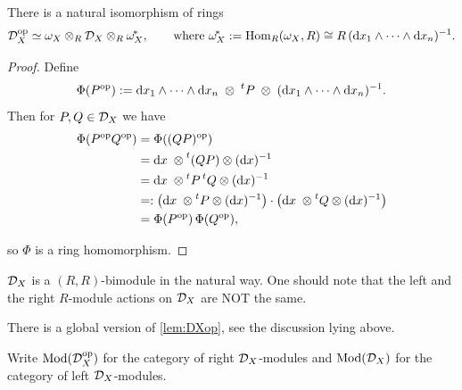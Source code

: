 \begin{lemma}\label{lem:DXop}
    There is a natural isomorphism of rings
    \[
        \mathcal{D}_X^{\mathrm{op}} \simeq \omega_X \otimes_R \mathcal{D}_X \otimes_R \omega_X^{\!*},\qquad
        \text{where } \omega_X^{\!*}:=\operatorname{Hom}_R(\omega_X,R) \cong R\,(\mathrm d x_1\wedge\cdots\wedge\mathrm d x_n)^{-1}.
    \]
\end{lemma}
\begin{proof}
    Define
    \[
        \Phi(P^{\mathrm{op}}):=\mathrm d x_1\wedge\cdots\wedge\mathrm d x_n\;\otimes\; \prescript{t}{}{P}\;\otimes\;
        (\mathrm d x_1\wedge\cdots\wedge\mathrm d x_n)^{-1}.
    \]
    Then for $P,Q\in\mathcal{D}_X$ we have
    \begin{align*}
        \Phi(P^{\mathrm{op}}Q^{\mathrm{op}})
         & = \Phi((QP)^{\mathrm{op}})                                                            \\
         & = \mathrm d x\;\otimes \prescript{t}{}{(QP)}\otimes (\mathrm d x)^{-1}                \\
         & = \mathrm d x\;\otimes \prescript{t}{}{P}\prescript{t}{}{Q}\otimes (\mathrm d x)^{-1} \\
         & =: \left(\mathrm d x\;\otimes \prescript{t}{}{P}\otimes (\mathrm d x)^{-1}\right)
        \cdot \left(\mathrm d x\;\otimes \prescript{t}{}{Q}\otimes (\mathrm d x)^{-1}\right)     \\
         & = \Phi(P^{\mathrm{op}})\,\Phi(Q^{\mathrm{op}}),
    \end{align*}

    so $\Phi$ is a ring homomorphism.
\end{proof}

\begin{remark}
    $\mathcal{D}_X$ is a $(R,R)$-bimodule in the natural way. One should note that the left and the right $R$-module actions on $\mathcal{D}_X$ are NOT the same.
\end{remark}

\begin{remark}
    There is a global version of \ref{lem:DXop}, see the discussion lying above\cite[Lemma~1.2.7.]{hotta2008d}.
\end{remark}

Write $\mathrm{Mod}(\mathcal{D}_X^{\mathrm{op}})$ for the category of right $\mathcal{D}_X$-modules and $\mathrm{Mod}(\mathcal{D}_X)$ for the
category of left $\mathcal{D}_X$-modules.

